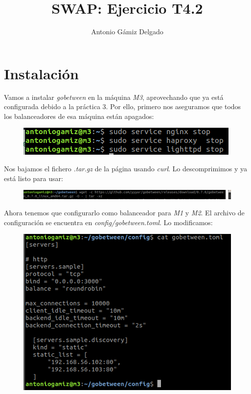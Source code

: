 \documentclass[12pt]{article}
\begin{document}
\title{SWAP: Ejercicio T4.2}
\author{
        Antonio Gámiz Delgado
}
\maketitle

\section{Instalación}

Vamos a instalar \textit{gobetween} en la máquina \textit{M3}, aprovechando que ya está configurada debido a la práctica 3. Por ello, primero nos aseguramos que todos los balanceadores de esa máquina están apagados:

\begin{figure}[H]
  \center
  \includegraphics[scale=0.5]{img/1.png}
\end{figure}

Nos bajamos el fichero \textit{.tar.gz} de la página \cite{gobetweeninstalacion} usando \textit{curl}. Lo descomprimimos y ya está listo para usar:

\begin{figure}[H]
  \center
  \includegraphics[scale=0.5]{img/2.png}
\end{figure}

Ahora tenemos que configurarlo como balanceador para \textit{M1} y \textit{M2}. El archivo de configuración se encuentra en \textit{config/gobetween.toml}. Lo modificamos:

\begin{figure}[H]
  \center
  \includegraphics[scale=0.5]{img/3.png}
\end{figure}
\end{document}
